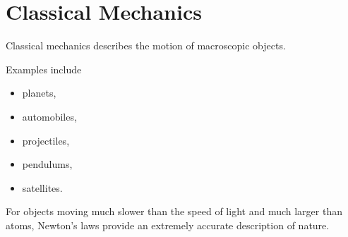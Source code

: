 \section{Classical Mechanics}

Classical mechanics describes the motion of macroscopic objects.

Examples include

\begin{itemize}
	\item planets,
	\item automobiles,
	\item projectiles,
	\item pendulums,
	\item satellites.
\end{itemize}

For objects moving much slower than the speed of light and much larger than
atoms, Newton's laws provide an extremely accurate description of nature.

